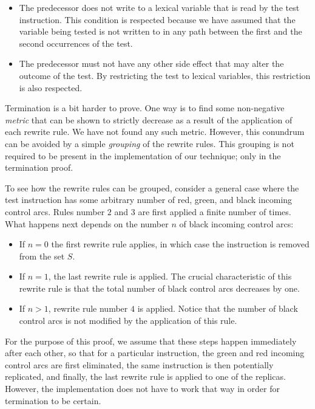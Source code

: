 \begin{itemize}
\item The predecessor does not write to a lexical variable that is
  read by the test instruction.  This condition is respected because
  we have assumed that the variable being tested is not written to
  in any path between the first and the second occurrences of the
  test.
\item The predecessor must not have any other side effect that may
  alter the outcome of the test.  By restricting the test to lexical
  variables, this restriction is also respected.
\end{itemize}

Termination is a bit harder to prove.  One way is to find some
non-negative \emph{metric} that can be shown to strictly decrease as a
result of the application of each rewrite rule.  We have not found any
such metric.  However, this conundrum can be avoided by a simple
\emph{grouping} of the rewrite rules.  This grouping is not required
to be present in the implementation of our technique; only in the
termination proof.

To see how the rewrite rules can be grouped, consider a general case
where the test instruction has some arbitrary number of red, green,
and black incoming control arcs.  Rules number $2$ and $3$ are first
applied a finite number of times.  What happens next depends on the
number $n$ of black incoming control arcs:

\begin{itemize}
\item If $n=0$ the first rewrite
rule applies, in which case the instruction is removed from the set
$S$.
\item If $n=1$, the last rewrite rule is applied.  The crucial
  characteristic of this rewrite rule is that the total number of
  black control arcs decreases by one.
\item If $n>1$, rewrite rule number $4$ is applied.  Notice that the
  number of black control arcs is not modified by the application of
  this rule.
\end{itemize}

For the purpose of this proof, we assume that these steps happen
immediately after each other, so that for a particular instruction,
the green and red incoming control arcs are first eliminated, the same
instruction is then potentially replicated, and finally, the last
rewrite rule is applied to one of the replicas.  However, the
implementation does not have to work that way in order for termination
to be certain.

